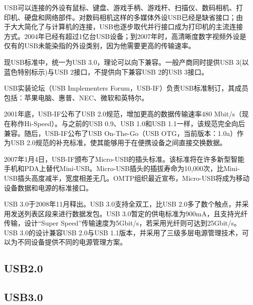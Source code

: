 USB可以连接的外设有鼠标、键盘、游戏手柄、游戏杆、扫描仪、数码相机、打印机、硬盘和网络部件。对数码相机这样的多媒体外设USB已经是缺省接口；由于大大简化了与计算机的连接，USB也逐步取代并行接口成为打印机的主流连接方式。2004年已经有超过1亿台USB设备；到2007年时，高清晰度数字视频外设是仅有的USB未能染指的外设类别，因为他需要更高的传输速率。

现USB标准中，统一为USB 3.0，理论可以向下兼容。一般产商同时提供USB 3(以蓝色特别标示)与USB 2接口，不提供向下兼容USB 2的USB 3接口。

USB实装论坛（USB Implementers Forum，USB-IF）负责USB标准制订，其成员包括：苹果电脑、惠普、NEC、微软和英特尔。

2001年底，USB-IF公布了USB 2.0规范，增加更高的数据传输速率480 Mbit/s（现在称作Hi-Speed）。与之前的USB 0.9、USB 1.0和USB 1.1一样，该规范完全向后兼容。随后，USB-IF公布了USB On-The-Go（USB OTG，当前版本：1.0a）作为USB 2.0规范的补充标准，使其能够用于在便携设备之间直接交换数据。

2007年1月4日，USB-IF颁布了Micro-USB的插头标准。该标准将在许多新型智能手机和PDA上替代Mini-USB。Micro-USB插头的插拔寿命为10,000次，比Mini-USB插头高度减半，宽度相差无几。OMTP组织最近宣布，Micro-USB将成为移动设备数据和电源的标准接口。

USB 3.0于2008年11月释出。USB 3.0支持全双工，比USB 2.0多了数个触点，并采用发送列表区段来进行数据发包。USB 3.0暂定的供电标准为900mA，且支持光纤传输，设计“Super Speed”传输速度为5Gbit/s，若采用光纤则可达到25Gbit/s。USB 3.0的设计兼容USB 2.0与USB 1.1版本，并采用了三级多层电源管理技术，可以为不同设备提供不同的电源管理方案。



\subsection{USB2.0}
\subsection{USB3.0}























